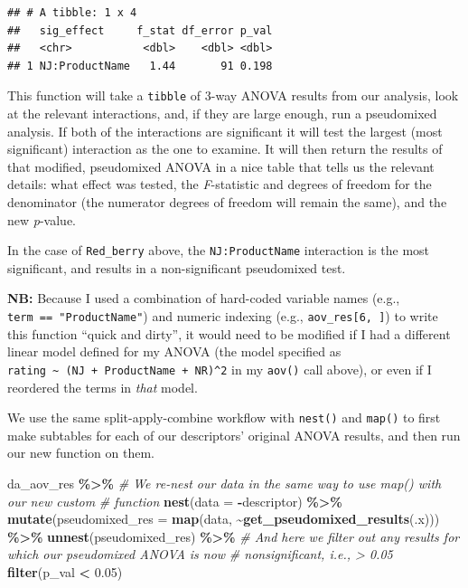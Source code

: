 \documentclass[
]{book}
\newenvironment{Shaded}{\begin{snugshade}}{\end{snugshade}}
\newcommand{\AttributeTok}[1]{\textcolor[rgb]{0.13,0.29,0.53}{#1}}
\newcommand{\CommentTok}[1]{\textcolor[rgb]{0.56,0.35,0.01}{\textit{#1}}}
\newcommand{\FloatTok}[1]{\textcolor[rgb]{0.00,0.00,0.81}{#1}}
\newcommand{\FunctionTok}[1]{\textcolor[rgb]{0.13,0.29,0.53}{\textbf{#1}}}
\newcommand{\NormalTok}[1]{#1}
\newcommand{\SpecialCharTok}[1]{\textcolor[rgb]{0.81,0.36,0.00}{\textbf{#1}}}
\begin{document}
\begin{verbatim}
## # A tibble: 1 x 4
##   sig_effect     f_stat df_error p_val
##   <chr>           <dbl>    <dbl> <dbl>
## 1 NJ:ProductName   1.44       91 0.198
\end{verbatim}

This function will take a \texttt{tibble} of 3-way ANOVA results from our analysis, look at the relevant interactions, and, if they are large enough, run a pseudomixed analysis. If both of the interactions are significant it will test the largest (most significant) interaction as the one to examine. It will then return the results of that modified, pseudomixed ANOVA in a nice table that tells us the relevant details: what effect was tested, the \emph{F}-statistic and degrees of freedom for the denominator (the numerator degrees of freedom will remain the same), and the new \emph{p}-value.

In the case of \texttt{Red\_berry} above, the \texttt{NJ:ProductName} interaction is the most significant, and results in a non-significant pseudomixed test.

\textbf{NB:} Because I used a combination of hard-coded variable names (e.g., \texttt{term\ ==\ "ProductName"}) and numeric indexing (e.g., \texttt{aov\_res{[}6,\ {]}}) to write this function ``quick and dirty'', it would need to be modified if I had a different linear model defined for my ANOVA (the model specified as \texttt{rating\ \textasciitilde{}\ (NJ\ +\ ProductName\ +\ NR)\^{}2} in my \texttt{aov()} call above), or even if I reordered the terms in \emph{that} model.

We use the same split-apply-combine workflow with \texttt{nest()} and \texttt{map()} to first make subtables for each of our descriptors' original ANOVA results, and then run our new function on them.

\begin{Shaded}
\begin{Highlighting}[]
\NormalTok{da\_aov\_res }\SpecialCharTok{\%\textgreater{}\%}
  \CommentTok{\# We re{-}nest our data in the same way to use map() with our new custom}
  \CommentTok{\# function}
  \FunctionTok{nest}\NormalTok{(}\AttributeTok{data =} \SpecialCharTok{{-}}\NormalTok{descriptor) }\SpecialCharTok{\%\textgreater{}\%}
  \FunctionTok{mutate}\NormalTok{(}\AttributeTok{pseudomixed\_res =} \FunctionTok{map}\NormalTok{(data, }\SpecialCharTok{\textasciitilde{}}\FunctionTok{get\_pseudomixed\_results}\NormalTok{(.x))) }\SpecialCharTok{\%\textgreater{}\%}
  \FunctionTok{unnest}\NormalTok{(pseudomixed\_res) }\SpecialCharTok{\%\textgreater{}\%}
  \CommentTok{\# And here we filter out any results for which our pseudomixed ANOVA is now}
  \CommentTok{\# nonsignificant, i.e., \textgreater{} 0.05}
  \FunctionTok{filter}\NormalTok{(p\_val }\SpecialCharTok{\textless{}} \FloatTok{0.05}\NormalTok{)}
\end{Highlighting}
\end{Shaded}
\end{document}
